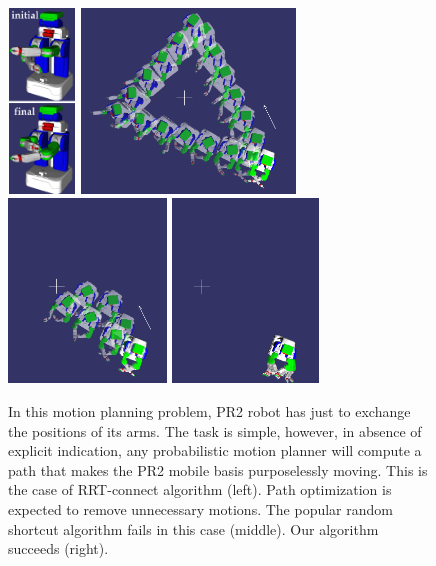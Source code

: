 \documentclass{tADR2e}
\begin{document}
\begin{figure}[H]
	\centering
	\includegraphics[height=4.9cm,width=1.8cm]{pr2_initial_final_vertical.png}
	\includegraphics[width=5.7cm]{p0_pr2_alone_merged3.png}
	\includegraphics[height=4.9cm]{p1RS_pr2_alone_merged3.png}
	\includegraphics[height=4.9cm]{p1GB_pr2_alone_merged3.png}\\
	\caption{In this motion planning problem, PR2 robot has just to 
exchange the positions of its arms. The task is simple, however, in absence of 
explicit indication, any probabilistic motion planner will compute a path that 
makes the PR2 mobile basis purposelessly moving. This is the case of RRT-connect 
algorithm (left). Path optimization is expected to remove unnecessary motions. 
The popular random shortcut algorithm fails in this case (middle). Our algorithm 
succeeds (right).}
	\label{pr2-final}
\end{figure}
\end{document}
